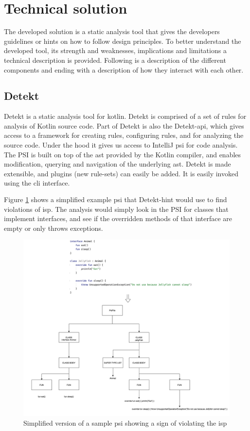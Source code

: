 \documentclass{report}
\begin{document}
\section{Technical solution}
\label{technical-solution}

The developed solution is a static analysis tool that gives the developers guidelines or hints on how to follow design principles. To better understand the developed tool, its strength and weaknesses, implications and limitations a technical description is provided. Following is a description of the different components and ending with a description of how they interact with each other.

\subsection{Detekt}
Detekt is a static analysis tool for kotlin. Detekt is comprised of a set of rules for analysis of Kotlin source code. Part of Detekt is also the Detekt-api, which gives access to a framework for creating rules, configuring rules, and for analyzing the source code. Under the hood it gives us access to IntelliJ \gls{psi} for code analysis. The PSI is built on top of the \gls{ast} provided by the Kotlin compiler, and enables modification, querying and navigation of the underlying \gls{ast}. Detekt is made extensible, and plugins (new rule-sets) can easily be added. It is easily invoked using the \gls{cli} interface.

Figure \ref{fig:psi} shows a simplified example \gls{psi} that Detekt-hint would use to find violations of \gls{isp}. The analysis would simply look in the PSI for classes that implement interfaces, and see if the overridden methods of that interface are empty or only throws exceptions. 

\begin{figure}[h!]
    \centering
    \includegraphics[width=\linewidth]{report/images/psi.png}
    \caption{Simplified version of a sample \gls{psi} showing a sign of violating the \gls{isp}}
    \label{fig:psi}
\end{figure}
\end{document}

